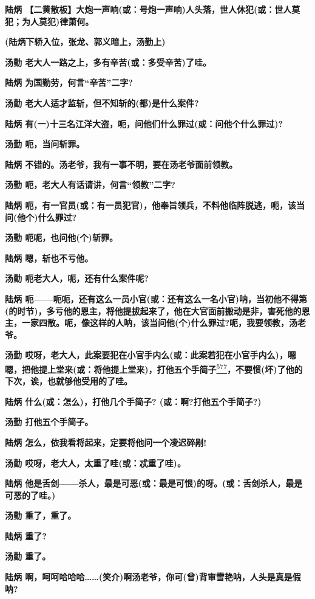 \textbf{陆炳
【二黄散板】大炮一声响(或：号炮一声响)人头落，世人休犯(或：世人莫犯；为人莫犯)律萧何。}

\textbf{(陆炳下轿入位，张龙、郭义暗上，汤勤上)}

\textbf{汤勤 老大人一路之上，多有辛苦(或：多受辛苦)了哇。}

\textbf{陆炳 为国勤劳，何言``辛苦''二字?}

\textbf{汤勤 老大人适才监斩，但不知斩的(都)是什么案件?}

\textbf{陆炳
有(一)十三名江洋大盗，呃，问他们什么罪过(或：问他个什么罪过)?}

\textbf{汤勤 呃，当问斩罪。}

\textbf{陆炳 不错的。汤老爷，我有一事不明，要在汤老爷面前领教。}

\textbf{汤勤 呃，老大人有话请讲，何言``领教''二字?}

\textbf{陆炳
呃，有一官员(或：有一员犯官)，他奉旨领兵，不料他临阵脱逃，呃，该当问(他个)什么罪过?}

\textbf{汤勤 呃呃，也问他(个)斩罪。}

\textbf{陆炳 嗯，斩也不亏他。}

\textbf{汤勤 呃老大人，呃，还有什么案件呢?}

\textbf{陆炳
呃------呃呃，还有这么一员小官(或：还有这么一名小官)呐，当初他不得第(的时节)，多亏他的恩主，将他提拔起来了，他在大官面前搬动是非，害死他的恩主，一家四散。呃，像这样的人呐，该当问他(个)什么罪过?呃，我要领教，汤老爷。}

\textbf{汤勤
哎呀，老大人，此案要犯在小官手内么(或：此案若犯在小官手内么)，嗯嗯，把他提上堂来(或：将他提上堂来)，打他五个手简子}\protect\hyperlink{fn577}{\textsuperscript{577}}\textbf{，不要惯(坏)了他的下次，诶，也就够他受用的了哇。}

\textbf{陆炳 什么(或：怎么)，打他几个手简子? (或：啊?打他五个手简子?)}

\textbf{汤勤 打他五个手简子。}

\textbf{陆炳 怎么，依我看将起来，定要将他问一个凌迟碎剐!}

\textbf{汤勤 哎呀，老大人，太重了哇(或：忒重了哇)。}

\textbf{陆炳
他是舌剑------杀人，最是可恶(或：最是可恨)的呀。(或：舌剑杀人，最是可恶的了哇。)}

\textbf{汤勤 重了，重了。}

\textbf{陆炳 重了?}

\textbf{汤勤 重了。}

\textbf{陆炳
啊，呵呵哈哈哈\ldots{}\ldots{}(笑介)啊汤老爷，你可(曾)背审雪艳呐，人头是真是假呐?}

